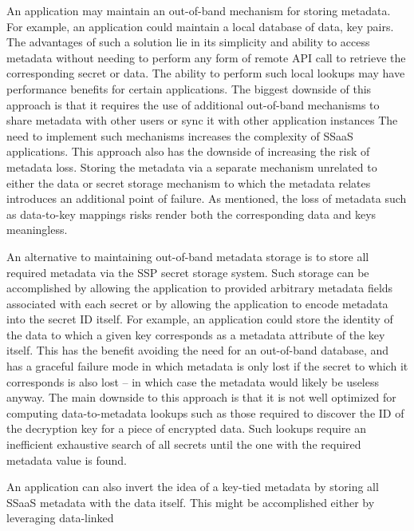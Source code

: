 \begin{packed_desc}
\item[Out-of-Band Metadata:] An application may maintain an
  out-of-band mechanism for storing metadata. For example, an
  application could maintain a local database of data, key pairs. The
  advantages of such a solution lie in its simplicity and ability to
  access metadata without needing to perform any form of remote API
  call to retrieve the corresponding secret or data. The ability to
  perform such local lookups may have performance benefits for certain
  applications. The biggest downside of this approach is that it
  requires the use of additional out-of-band mechanisms to share
  metadata with other users or sync it with other application
  instances The need to implement such mechanisms increases the
  complexity of SSaaS applications. This approach also has the
  downside of increasing the risk of metadata loss. Storing the
  metadata via a separate mechanism unrelated to either the data or
  secret storage mechanism to which the metadata relates introduces an
  additional point of failure. As mentioned, the loss of metadata such
  as data-to-key mappings risks render both the corresponding data and
  keys meaningless.
\item[Key-Tied Metadata:] An alternative to maintaining out-of-band
  metadata storage is to store all required metadata via the SSP
  secret storage system. Such storage can be accomplished by allowing
  the application to provided arbitrary metadata fields associated
  with each secret or by allowing the application to encode metadata
  into the secret ID itself. For example, an application could store
  the identity of the data to which a given key corresponds as a
  metadata attribute of the key itself. This has the benefit avoiding
  the need for an out-of-band database, and has a graceful failure
  mode in which metadata is only lost if the secret to which it
  corresponds is also lost -- in which case the metadata would likely
  be useless anyway. The main downside to this approach is that it is
  not well optimized for computing data-to-metadata lookups such as
  those required to discover the ID of the decryption key for a piece
  of encrypted data. Such lookups require an inefficient exhaustive
  search of all secrets until the one with the required metadata value
  is found.
\item[Data-Tied Metadata:] An application can also invert the idea of
  a key-tied metadata by storing all SSaaS metadata with the data
  itself. This might be accomplished either by leveraging data-linked

\end{packed_desc}
